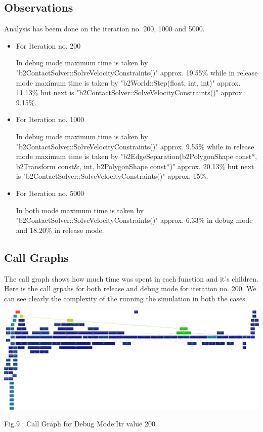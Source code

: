\documentclass[a4paper,11pt]{article}
\begin{document}
\subsection{Observations}
Analysis has beem done on the iteration no. 200, 1000 and 5000.
\begin{itemize}
\item{For Iteration no. 200}
\begin{description} In debug mode maximum time is taken by "b2ContactSolver::SolveVelocityConstraints()" approx. 19.55\% while in release mode maximum time is taken by "b2World::Step(float, int, int)" approx. 11.13\% but next is "b2ContactSolver::SolveVelocityConstraints()" approx. 9.15\%.
\end{description}

\item{For Iteration no. 1000}
\begin{description} In debug mode maximum time is taken by "b2ContactSolver::SolveVelocityConstraints()" approx. 9.55\% while in release mode maximum time is taken by "b2EdgeSeparation(b2PolygonShape const*, b2Transform const\&, int, b2PolygonShape const*)" approx. 20.13\% but next is "b2ContactSolver::SolveVelocityConstraints()" approx. 15\%.
\end{description}

\item{For Iteration no. 5000}
\begin{description} In both mode maximum time is taken by "b2ContactSolver::SolveVelocityConstraints()" approx. 6.33\% in debug mode and 18.20\% in release mode.
\end{description}

\end{itemize}

\subsection{Call Graphs}
The call graph shows how much time was spent in each function and it’s children. Here is the call grpahs for both release and debug mode for iteration no. 200. We can see clearly the complexity of the running the simulation in both the cases.

\begin{center}
\includegraphics[scale=0.1]{./doc/deb_output200.png}
\begin{center}
Fig.9 : Call Graph for Debug Mode:Itr value 200
\end{center}
\end{center}
\end{document}
